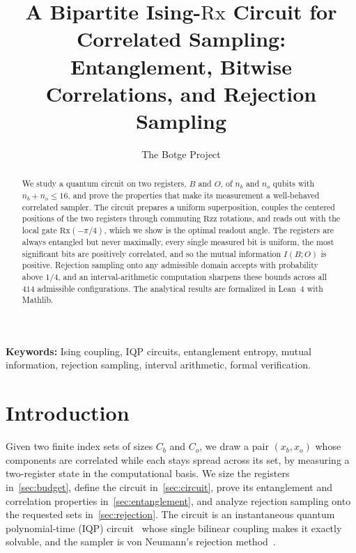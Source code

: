 \documentclass[11pt,a4paper]{article}
\title{%
  A Bipartite Ising-\texorpdfstring{\( \mathrm{Rx} \)}{Rx} Circuit for Correlated Sampling:\\
  Entanglement, Bitwise Correlations, and Rejection Sampling%
}
\author{The Botge Project}
\date{}
\theoremstyle{plain}
\theoremstyle{definition}
\theoremstyle{remark}
\begin{document}
\maketitle

\begin{abstract}
  We study a quantum circuit on two registers, \( B \) and \( O \), of \( n_b \) and \( n_o \)
  qubits with \( n_b + n_o \le 16 \), and prove the properties that make its measurement a
  well-behaved correlated sampler. The circuit prepares a uniform superposition, couples the
  centered positions of the two registers through commuting \( \mathrm{Rzz} \) rotations, and
  reads out with the local gate \( \mathrm{Rx}(-\pi / 4) \), which we show is the optimal
  readout angle. The registers are always entangled but never maximally, every single measured
  bit is uniform, the most significant bits are positively correlated, and so the mutual
  information \( I(B; O) \) is positive. Rejection sampling onto any admissible domain accepts
  with probability above \( 1/4 \), and an interval-arithmetic computation sharpens these bounds
  across all \( 414 \) admissible configurations. The analytical results are formalized in
  Lean~4 with Mathlib.
\end{abstract}

\noindent\textbf{Keywords:} Ising coupling, IQP circuits, entanglement entropy, mutual
information, rejection sampling, interval arithmetic, formal verification.

\section{Introduction}\label{sec:introduction}

Given two finite index sets of sizes \( C_b \) and \( C_o \), we draw a pair \( (x_b, x_o) \)
whose components are correlated while each stays spread across its set, by measuring a
two-register state in the computational basis. We size the registers in~\cref{sec:budget},
define the circuit in~\cref{sec:circuit}, prove its entanglement and correlation properties
in~\cref{sec:entanglement}, and analyze rejection sampling onto the requested sets
in~\cref{sec:rejection}. The circuit is an instantaneous quantum polynomial-time (IQP)
circuit~\cite{ShepherdBremner2009,BremnerJozsaShepherd2011} whose single bilinear coupling makes
it exactly solvable, and the sampler is von Neumann's rejection method~\cite{vonNeumann1951}.
\end{document}
